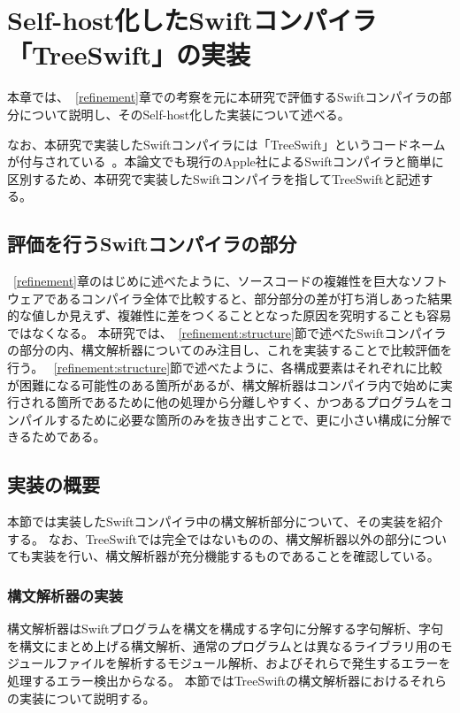 \chapter{Self-host化したSwiftコンパイラ「TreeSwift」の実装}
\label{implementation}

本章では、~\ref{refinement}章での考察を元に本研究で評価するSwiftコンパイラの部分について説明し、そのSelf-host化した実装について述べる。

なお、本研究で実装したSwiftコンパイラには「TreeSwift」というコードネームが付与されている~\cite{treeswift}。本論文でも現行のApple社によるSwiftコンパイラと簡単に区別するため、本研究で実装したSwiftコンパイラを指してTreeSwiftと記述する。

\section{評価を行うSwiftコンパイラの部分}
\label{implementation:part}

~\ref{refinement}章のはじめに述べたように、ソースコードの複雑性を巨大なソフトウェアであるコンパイラ全体で比較すると、部分部分の差が打ち消しあった結果的な値しか見えず、複雑性に差をつくることとなった原因を究明することも容易ではなくなる。
本研究では、~\ref{refinement:structure}節で述べたSwiftコンパイラの部分の内、構文解析器についてのみ注目し、これを実装することで比較評価を行う。
~\ref{refinement:structure}節で述べたように、各構成要素はそれぞれに比較が困難になる可能性のある箇所があるが、構文解析器はコンパイラ内で始めに実行される箇所であるために他の処理から分離しやすく、かつあるプログラムをコンパイルするために必要な箇所のみを抜き出すことで、更に小さい構成に分解できるためである。

\section{実装の概要}
\label{implementation:abstract}

本節では実装したSwiftコンパイラ中の構文解析部分について、その実装を紹介する。
なお、TreeSwiftでは完全ではないものの、構文解析器以外の部分についても実装を行い、構文解析器が充分機能するものであることを確認している。

\subsection{構文解析器の実装}
\label{implementation:abstract:parser}

構文解析器はSwiftプログラムを構文を構成する字句に分解する字句解析、字句を構文にまとめ上げる構文解析、通常のプログラムとは異なるライブラリ用のモジュールファイルを解析するモジュール解析、およびそれらで発生するエラーを処理するエラー検出からなる。
本節ではTreeSwiftの構文解析器におけるそれらの実装について説明する。

